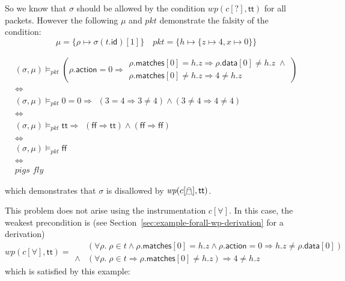 \documentclass{article}
\newcommand{\pkt}{\mathit{pkt}}
\newcommand{\TRUE}{\mathsf{tt}}
\newcommand{\FALSE}{\mathsf{ff}}
\newcommand{\matches}{\mathsf{matches}}
\newcommand{\action}{\mathsf{action}}
\newcommand{\data}{\mathsf{data}}
\newcommand{\id}{\mathsf{id}}
\newcommand{\WP}{\textit{wp}}
\newcommand{\satisfy}[3]{({#1,#3}) \models_{#2}}
\newcommand{\instr}{[\forall]}
\newcommand{\ginstr}{[\mathghost]}
\begin{document}
So we know that $\sigma$ should be allowed by the condition $\WP(c[?],\TRUE)$ for all packets. However the following $\mu$ and $pkt$ demonstrate the falsity of the condition:
\[\mu = \{\rho \mapsto \sigma(t.\id)[1]\}
\quad
\pkt = \{h \mapsto \{z \mapsto 4, x\mapsto 0\}\} \]

\[\begin{array}{l}
\satisfy\sigma\pkt\mu \left(\rho.\action = 0 \Rightarrow
\begin{array}{l}
  \rho.\matches[0] = h.z \Rightarrow \rho.\data[0] \neq h.z\;\wedge \\
  \rho.\matches[0] \neq h.z \Rightarrow 4 \neq h.z
\end{array}\right)\\
\iff\\
\satisfy\sigma\pkt\mu  0 = 0 \Rightarrow
\begin{array}{l}
  (3 = 4 \Rightarrow 3 \neq 4) \wedge
  (3 \neq 4 \Rightarrow 4 \neq 4)
\end{array} \\
\iff \\
\satisfy\sigma\pkt\mu \TRUE \Rightarrow
\begin{array}{l}
  (\FALSE \Rightarrow \TRUE)\wedge (\FALSE \Rightarrow \FALSE)
\end{array} \\
\iff\\
\satisfy\sigma\pkt\mu \FALSE \\
\iff \\
\textit{pigs fly}
\end{array}
\]

\noindent which demonstrates that $\sigma$ is disallowed by $\WP(c\ginstr,\TRUE)$.

This problem does not arise using the instrumentation $c\instr$. In this case,
the  weakest precondition is (see Section~\ref{sec:example-forall-wp-derivation} for a derivation)
\[
\WP(c\instr,\TRUE) =
\begin{array}{rl}
&(\forall \rho.\; \rho \in t \wedge \rho.\matches[0] = h.z \wedge \rho.\action = 0
\Rightarrow h.z \neq \rho.\data[0])\\
\wedge
& (\forall \rho.\;\rho \in t \Rightarrow\rho.\matches[0] \neq h.z) \Rightarrow 4 \neq h.z
\end{array}
\]
\noindent which is satisfied by this example:
\end{document}
